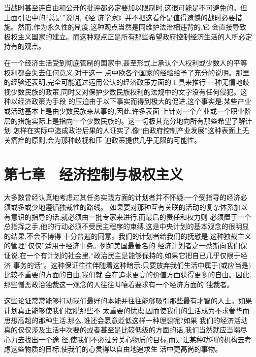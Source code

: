 ﻿\documentclass[12pt]{article}
\begin{document}
当战时甚至连自由和公开的批评都必定要加以限制时,这很可能是不可避免的。但上面引语中的``总是''说明,《经
济学家》并不把这看作是值得遗憾的战时必要措施。然而,作为永久性的制度,这种观点当然是同维护法治相违背的,它
会直接导致极权主义国家的建立。而这种观点正是所有那些希望政府控制经济生活的人所必定持有的观点。

在一个经济生活受到彻底管制的国家中,甚至形式上承认个人权利或少数人的平等权利都会失去任何意义,对于这一
点中欧各个国家的经验给予了充分的说明。那里的经验还表明,完全可能通过运用公认的经济政策方面的工具来推行
一种无情地歧视少数民族的政策,同时又对保护少数民族权利的法规中的文字没有任何侵犯。这种以经济政策为手段
的压迫由于以下事实而得到极大的促进,这个事实是:某些产业或活动基本上是由少数民族来从事的,因此,许多表面
上针对一个产业或一个职业阶层的措施实际上是指向一个少数民族的。这一切极其充分地向所有那些希望了解计划
怎样在实际中造成政治后果的人证实了,像``由政府控制产业发展''这种表面上无关痛痒的原则,会为那种歧视和压
迫政策提供几乎无限的可能性。



\section{第七章　经济控制与极权主义}


大多数曾经认真地考虑过其任务实践方面的计划者并不怀疑:一个受指导的经济必须或多或少地遵循独裁性的路线。
如果要对那种互有关联的活动的复杂体系加以有意识的指导的话,就必须由一批专家来进行,而最后的责任和权力则
必须置于一个总指挥之手,他的行动必须不受民主程序的束缚,这是中央计划的基本观念的很明显的结果,不会不博得
十分普遍的同意。我们的计划者给我们的抚慰是,这种独裁主义的管理``仅仅''适用于经济事务。例如美国最著名的
经济计划者之一蔡斯向我们保证说,在一个有计划的社会里,``政治民主是能够保持的,如果它把自已几乎仅限于经济
事务的话''。这种保证往往伴随着这种暗示:只要放弃我们生活中属于(或应当是)比较不重要的方面的自由,我们就
会在追求更高的价值方面获得更多的自由。因此,那些憎恶政治独裁这一观念的人往往叫嚷着要求有一个经济方面的
独裁者。

这些论证常常能够打动我们最好的本能并往往能够吸引那些最有才智的人士。如果计划真正能够使我们摆脱那些不
太重要的忧虑,因而使我们的生活成为不求奢华而思想高超的那种生活,那么,谁还会愿意贬低这样一种理想呢?如果
我们的经济活动真的仅仅涉及生活中次要的或者甚至是比较低级的方面的话,我们当然就应当竭尽心力去找出一个途
径,使我们不必过分关心物质的目标,而是让某种功利的机构去考虑这些物质的目标,使我们的心灵得以自由地追求生
活中更高尚的事物。
\end{document}

